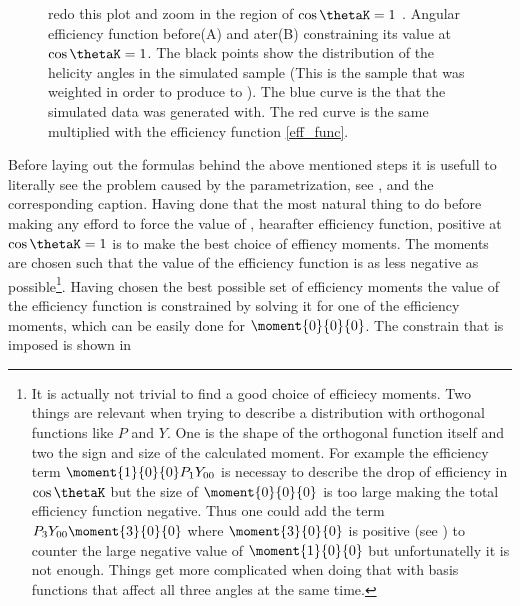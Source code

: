 \begin{figure}[h]
  \centering
  \begin{subfigure}{0.5\textwidth}
    \scalebox{1.3}{}
    \caption{}
    \label{angAcc_nom}
  \end{subfigure}%
  \hfill%
  \begin{subfigure}{0.5\textwidth}
    \scalebox{1.3}{}
    \caption{}
    \label{angAcc_constr}
  \end{subfigure}
  \caption{{\color{red} redo this plot and zoom in the region of $\cos\thetaK=1$ }. Angular efficiency function before(A) and ater(B) constraining its value at $\cos\thetaK=1$. The black points show the distribution of the 
           helicity angles in the simulated sample (This is the sample that was weighted in order to produce  to ). 
           The blue curve is the \pdf that the simulated data was generated with. The red curve is the same \pdf multiplied with the efficiency function 
           \eqref{eff_func}. 
            }
\end{figure}

Before laying out the formulas behind the above mentioned steps it is usefull to literally see the problem caused by the parametrization, see , 
and the corresponding caption. Having done that the most natural thing to do before making any efford to force the value of , hearafter efficiency function,
positive at $\cos\thetaK=1$ is to make the best choice of effiency moments. The moments are chosen such that the value of the efficiency function is as less negative
as 
possible\footnote{It is actually not trivial to find a good choice of efficiecy moments. Two things are relevant when trying to describe a 
distribution with orthogonal functions like $P$ and $Y$. One is the shape of the orthogonal function itself and two the sign and size of the calculated moment.
For example the efficiency term $\moment{1}{0}{0}P_1Y_{00}$ is necessay to describe the drop of efficiency in $\cos\thetaK$ but the size of $\moment{0}{0}{0}$ 
is too large making the total efficiency function negative. Thus one could add the term $P_3Y_{00}\moment{3}{0}{0}$ where $\moment{3}{0}{0}$ is positive
(see  ) to counter the large negative value of $\moment{1}{0}{0}$ but unfortunatelly it is not enough. Things get more complicated
when doing that with basis functions that affect all three angles at the same time.
}.
Having chosen the best possible set of efficiency moments the value of the efficiency function is constrained by solving it for
one of the efficiency moments, which can be easily done for $\moment{0}{0}{0}$. The constrain that is imposed is shown in 

